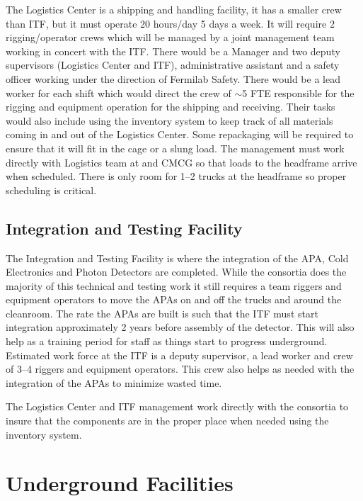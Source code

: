The Logistics Center is a shipping and handling facility, it has a
smaller crew than ITF, but it must operate 20 hours/day 5 days a week.
It will require 2 rigging/operator crews which will be managed by a
joint management team working in concert with the ITF.  There would be
a Manager and two deputy supervisors (Logistics Center and ITF),
administrative assistant and a safety officer working under the direction
of Fermilab Safety.  There would be a lead worker for each shift which
would direct the crew of $\sim$5 FTE responsible for the rigging and
equipment operation for the shipping and receiving.  Their tasks would
also include using the inventory system to keep track of all materials
coming in and out of the Logistics Center. Some repackaging will be
required to ensure that it will fit in the cage or a slung load.  The
management must work directly with  Logistics team at \surf and
CMCG so that loads to the headframe arrive when scheduled.  There is
only room for 1--2 trucks at the headframe so proper scheduling is
critical.

\subsection{Integration and Testing Facility}

The Integration and Testing Facility is where the integration of the
APA, Cold Electronics and Photon Detectors are completed. While the
consortia does the majority of this technical and testing work it
still requires a team riggers and equipment operators to move the APAs
on and off the trucks and around the cleanroom.  The rate the APAs are
built is such that the ITF must start integration approximately 2
years before assembly of the detector.  This will also help as a
training period for  staff as things
start to progress underground.  Estimated work force at the ITF is a
deputy supervisor, a lead worker and crew of 3--4 riggers and equipment
operators.  This crew also helps as needed with the integration of the
APAs to minimize wasted time.

The Logistics Center and ITF management work directly with the
consortia to insure that the components are in the proper place when
needed using the inventory system.
  

\section{Underground Facilities}

